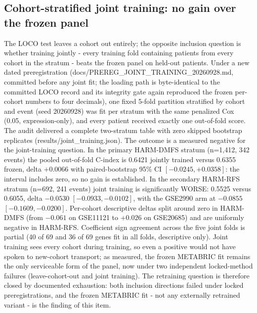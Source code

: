 \documentclass[12pt,a4paper]{article}
\begin{document}
\subsection{Cohort-stratified joint training: no gain over the frozen panel}
{\sloppy
The LOCO test leaves a cohort out entirely; the opposite inclusion question
is whether training jointly - every training fold containing patients from
every cohort in the stratum - beats the frozen panel on held-out patients.
Under a new dated preregistration
(docs/PREREG\_JOINT\_TRAINING\_20260928.md, committed before any joint
fit; the loading path is byte-identical to the committed LOCO record and its
integrity gate again reproduced the frozen per-cohort numbers to four
decimals), one fixed 5-fold partition stratified by cohort and event
(seed 20260928) was fit per stratum with the same penalized Cox (0.05,
expression-only), and every patient received exactly one out-of-fold score.
The audit delivered a complete two-stratum table with zero skipped bootstrap
replicates (results/joint\_training.json). The outcome is a measured
negative for the joint-training question. In the primary HARM-DMFS stratum
(n=1,412, 342 events) the pooled out-of-fold C-index is 0.6421 jointly
trained versus 0.6355 frozen, delta $+0.0066$ with paired-bootstrap 95\% CI
$[-0.0245,+0.0358]$: the interval includes zero, so no gain is established.
In the secondary HARM-RFS stratum (n=692, 241 events) joint training is
significantly WORSE: 0.5525 versus 0.6055, delta $-0.0530$
$[-0.0933,-0.0102]$, with the GSE2990 arm at $-0.0855$ $[-0.1609,-0.0200]$.
Per-cohort descriptive deltas split around zero in HARM-DMFS (from $-0.061$
on GSE11121 to $+0.026$ on GSE20685) and are uniformly negative in HARM-RFS.
Coefficient sign agreement across the five joint folds is partial (40 of 69
and 36 of 69 genes fit in all folds, descriptive only). Joint training sees
every cohort during training, so even a positive would not have spoken to
new-cohort transport; as measured, the frozen METABRIC fit remains the only
serviceable form of the panel, now under two independent locked-method
failures (leave-cohort-out and joint training). The retraining question is
therefore closed by documented exhaustion: both inclusion directions failed
under locked preregistrations, and the frozen METABRIC fit - not any
externally retrained variant - is the finding of this item.
\par}
\end{document}
